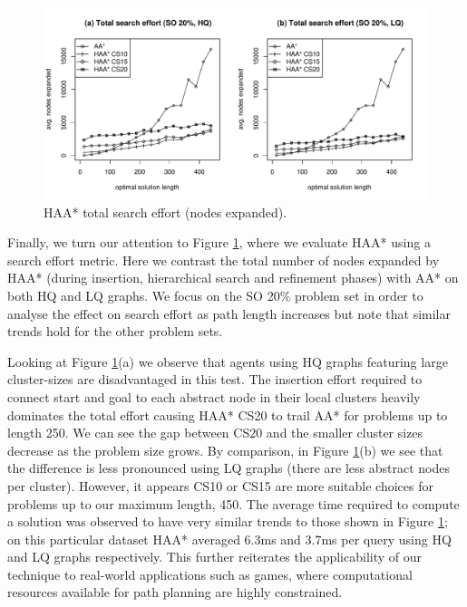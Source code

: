 \begin{figure}[htbp]
	\vspace{-8pt}
	\begin{center}
		       \includegraphics[scale=0.35, trim = 20mm 18mm 20mm 0mm]{diagrams/searcheffort.pdf}
	\end{center}
	\caption{HAA* total search effort (nodes expanded).}
	\label{aha-fig:searcheffort}
	\vspace{-2pt}
\end{figure}
%
\par \indent
Finally, we turn our attention to Figure \ref{aha-fig:searcheffort}, where we evaluate HAA* using a search effort metric.
Here we contrast the total number of nodes expanded by HAA* (during insertion, hierarchical search and refinement phases) with AA* on both HQ and LQ graphs.
We focus on the SO 20\% problem set in order to analyse the effect on search effort as path length increases but note that similar trends hold for the other problem sets.
\par \indent
Looking at Figure \ref{aha-fig:searcheffort}(a) we observe that agents using HQ graphs featuring large cluster-sizes are disadvantaged in this test. 
The insertion effort required to connect start and goal to each abstract node in their local clusters heavily dominates the total effort causing HAA* CS20 to trail AA* for problems up to length 250.
We can see the gap between CS20 and the smaller cluster sizes decrease as the problem size grows.
By comparison, in Figure \ref{aha-fig:searcheffort}(b) we see that the difference is less pronounced using LQ graphs (there are less abstract nodes per cluster). However, it appears CS10 or CS15 are more suitable choices for problems up to our maximum length, 450.
The average time required to compute a solution was observed to have very similar trends to those shown in Figure \ref{aha-fig:searcheffort}; on this particular dataset HAA* averaged 6.3ms and 3.7ms per query using HQ and LQ graphs respectively.
This further reiterates the applicability of our technique to real-world applications such as games, where computational resources available for path planning are highly constrained. 
